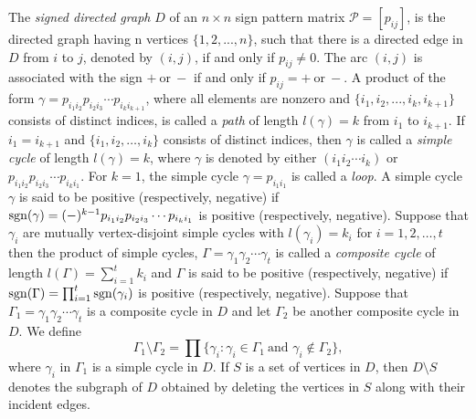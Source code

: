 \documentclass[a4paper, 10pt]{article}
\numberwithin{equation}{section}
\def\sgn{{\rm sgn}}
\begin{document}
	
	The \textit{signed directed graph} $D$ of an $n\times n$ sign pattern matrix $\mathcal{P}=[p_{ij}]$, is the directed graph having n vertices $\{1,2,...,n\}$, such that there is a directed edge in $D$ from $i$ to $j$, denoted by $(i,j)$, if and only if $p_{ij}\neq 0$. The arc $(i,j)$ is associated with the sign $+~\text{or}~-$ if and only if $p_{ij}=+~\text{or}~-$. 
	A product of the form $\gamma=p_{i_1i_2}p_{i_2i_3}\cdots p_{i_ki_{k+1}}$, where all elements are nonzero and $\{i_1,i_2,...,i_k, i_{k+1}\}$ consists of distinct indices, is called a \textit{path} of length $l(\gamma)=k$ from $i_1$ to $i_{k+1}$.
	If $i_1 = i_{k+1}$ and $\{i_1, i_2, \dots, i_k\}$ consists of distinct indices, then $\gamma$ is called a \textit{simple cycle}  of length $l(\gamma)=k$, where $\gamma$ is denoted by either $(i_1i_2\cdots i_k)$ or $p_{i_1i_2}p_{i_2i_3}\cdots p_{i_ki_{1}}$. For $k=1$, the simple cycle $\gamma=p_{i_1i_1}$ is called a \textit{loop}.
	A simple cycle $\gamma$ is said to be positive (respectively, negative) if $\sgn(\gamma)=(-)^{k-1}p_{i_1i_2}p_{i_2i_3}\cdots p_{i_ki_{1}}$ is positive (respectively, negative). 
	Suppose that $\gamma_i$ are mutually vertex-disjoint simple cycles with 
	$l(\gamma_i) = k_i$ for $i = 1, 2, \dots, t$ then the product of simple cycles, $\Gamma=\gamma_1 \gamma_2\cdots \gamma_t$ is called a \textit{composite cycle} of length $l(\Gamma)=\sum_{i=1}^{t}k_i$ and $\Gamma$ is said to be positive (respectively, negative) if $\sgn(\Gamma)=\prod_{i=1}^t\sgn(\gamma_i)$ is positive (respectively, negative). 
	Suppose that $\Gamma_1 = \gamma_1\gamma_2\cdots\gamma_t$ is a composite cycle in $D$ and let $\Gamma_2$ be another composite cycle in $D$. We define
	$$
	\Gamma_1 \setminus \Gamma_2 = \prod\{\gamma_i : \gamma_i \in \Gamma_1 ~\text{and } \gamma_i \notin \Gamma_2\},$$
	where \(\gamma_i \text{ in } \Gamma_1\) is a simple cycle in $D$.
	If $S$ is a set of vertices in $D$, then $D \setminus S$ denotes the subgraph of $ D $ obtained by deleting the vertices in $S$ along with their incident edges.
	
	
	
\end{document}
